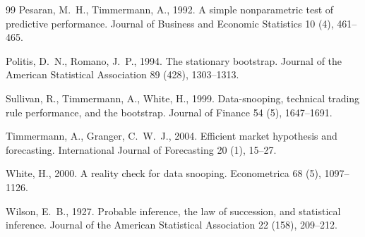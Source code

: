 \documentclass[preprint,12pt,authoryear,a4paper]{elsarticle}
\begin{document}
\begin{thebibliography}{99}
Pesaran, M.~H., Timmermann, A., 1992.
A simple nonparametric test of predictive performance.
Journal of Business and Economic Statistics 10 (4), 461--465.

Politis, D.~N., Romano, J.~P., 1994.
The stationary bootstrap.
Journal of the American Statistical Association 89 (428), 1303--1313.

Sullivan, R., Timmermann, A., White, H., 1999.
Data-snooping, technical trading rule performance, and the bootstrap.
Journal of Finance 54 (5), 1647--1691.

Timmermann, A., Granger, C.~W.~J., 2004.
Efficient market hypothesis and forecasting.
International Journal of Forecasting 20 (1), 15--27.

White, H., 2000.
A reality check for data snooping.
Econometrica 68 (5), 1097--1126.

Wilson, E.~B., 1927.
Probable inference, the law of succession, and statistical inference.
Journal of the American Statistical Association 22 (158), 209--212.

\end{thebibliography}
\end{document}
